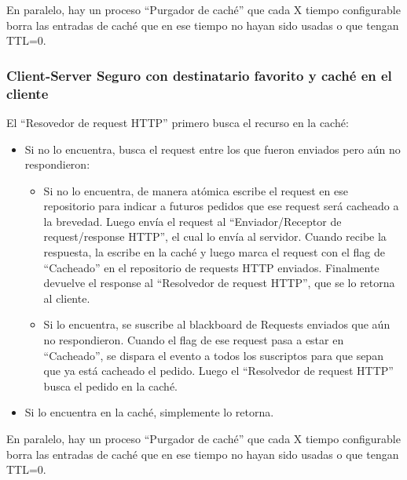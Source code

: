 En paralelo, hay un proceso ``Purgador de caché'' que cada X tiempo configurable borra las entradas
de caché que en ese tiempo no hayan sido usadas o que tengan TTL=0.


\subsubsection{Client-Server Seguro con destinatario favorito y caché en el cliente}


El ``Resovedor de request HTTP'' primero busca el recurso en la caché:
\begin{itemize}
	\item Si no lo encuentra, busca el request entre los que fueron enviados pero aún no respondieron:
	\begin{itemize}
		\item Si no lo encuentra, de manera atómica escribe el request en ese repositorio para indicar a futuros
        pedidos que ese request será cacheado a la brevedad. Luego envía el request al ``Enviador/Receptor de
        request/response HTTP'', el cual lo envía al servidor. Cuando recibe la respuesta, la escribe en la caché
        y luego marca el request con el flag de ``Cacheado'' en el repositorio de requests HTTP enviados. Finalmente
        devuelve el response al ``Resolvedor de request HTTP'', que se lo retorna al cliente.
        
        \item Si lo encuentra, se suscribe al blackboard de Requests enviados que aún no respondieron.
        Cuando el flag de ese request pasa a estar en ``Cacheado'', se dispara el evento
        a todos los suscriptos para que sepan que ya está cacheado el pedido. Luego el ``Resolvedor de
        request HTTP'' busca el pedido en la caché.
	\end{itemize}
	
	\item  Si lo encuentra en la caché, simplemente lo retorna.
\end{itemize}

En paralelo, hay un proceso ``Purgador de caché'' que cada X tiempo configurable borra las entradas
de caché que en ese tiempo no hayan sido usadas o que tengan TTL=0.